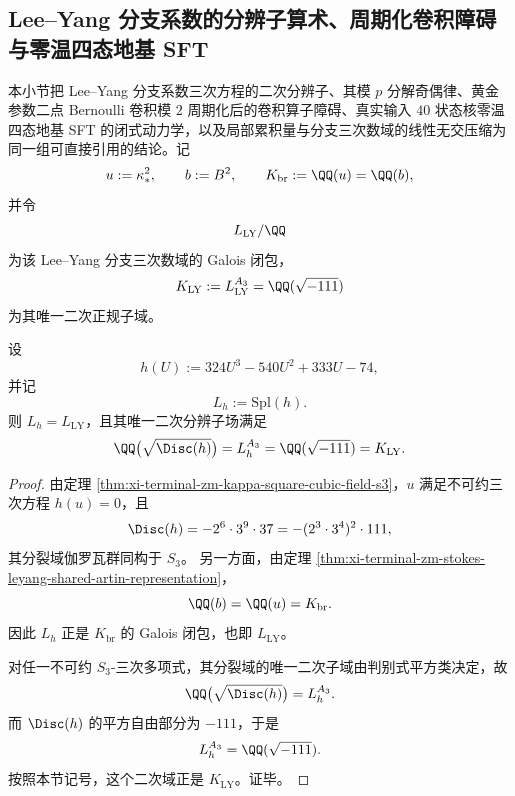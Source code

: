 \subsection{Lee--Yang 分支系数的分辨子算术、周期化卷积障碍与零温四态地基 \texorpdfstring{SFT}{SFT}}\label{subsec:conclusion-leyang-resolvent-euler-riesz-field-stratification}
本小节把 Lee--Yang 分支系数三次方程的二次分辨子、其模 \(p\) 分解奇偶律、黄金参数二点 Bernoulli 卷积模 \(2\) 周期化后的卷积算子障碍、真实输入 \(40\) 状态核零温四态地基 SFT 的闭式动力学，以及局部累积量与分支三次数域的线性无交压缩为同一组可直接引用的结论。记
\[
u:=\kappa_*^2,\qquad
b:=B^2,\qquad
K_{\mathrm{br}}:=\QQ(u)=\QQ(b),
\]
并令
\[
L_{\mathrm{LY}}/\QQ
\]
为该 Lee--Yang 分支三次数域的 Galois 闭包，
\[
K_{\mathrm{LY}}:=L_{\mathrm{LY}}^{A_3}=\QQ(\sqrt{-111})
\]
为其唯一二次正规子域。

\begin{theorem}\label{thm:conclusion-leyang-dominant-edge-quadratic-resolvent-minus111}
设
\[
h(U):=324U^3-540U^2+333U-74,
\]
并记
\[
L_h:=\mathrm{Spl}(h).
\]
则 \(L_h=L_{\mathrm{LY}}\)，且其唯一二次分辨子场满足
\[
\QQ\bigl(\sqrt{\Disc(h)}\bigr)=L_h^{A_3}=\QQ(\sqrt{-111})=K_{\mathrm{LY}}.
\]
\end{theorem}
\begin{proof}
由定理 \ref{thm:xi-terminal-zm-kappa-square-cubic-field-s3}，\(u\) 满足不可约三次方程 \(h(u)=0\)，且
\[
\Disc(h)=-2^6\cdot 3^9\cdot 37=-(2^3\cdot 3^4)^2\cdot 111,
\]
其分裂域伽罗瓦群同构于 \(S_3\)。
另一方面，由定理 \ref{thm:xi-terminal-zm-stokes-leyang-shared-artin-representation}，
\[
\QQ(b)=\QQ(u)=K_{\mathrm{br}}.
\]
因此 \(L_h\) 正是 \(K_{\mathrm{br}}\) 的 Galois 闭包，也即 \(L_{\mathrm{LY}}\)。

对任一不可约 \(S_3\)-三次多项式，其分裂域的唯一二次子域由判别式平方类决定，故
\[
\QQ\bigl(\sqrt{\Disc(h)}\bigr)=L_h^{A_3}.
\]
而 \(\Disc(h)\) 的平方自由部分为 \(-111\)，于是
\[
L_h^{A_3}=\QQ(\sqrt{-111}).
\]
按照本节记号，这个二次域正是 \(K_{\mathrm{LY}}\)。证毕。
\end{proof}

